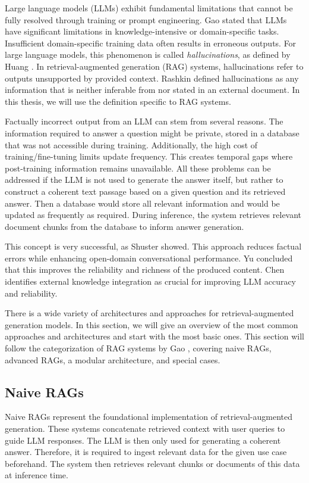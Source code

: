 Large language models (LLMs) exhibit fundamental limitations that cannot be fully resolved through training or prompt engineering. Gao \cite{Gao.18.12.2023} stated that LLMs have significant limitations in knowledge-intensive or domain-specific tasks. Insufficient domain-specific training data often results in erroneous outputs. For large language models, this phenomenon is called \textit{hallucinations}, as defined by Huang \cite{Huang_2023}. In retrieval-augmented generation (RAG) systems, hallucinations refer to outputs unsupported by provided context. Rashkin \cite{Rashkin.} defined hallucinations as any information that is neither inferable from nor stated in an external document. In this thesis, we will use the definition specific to RAG systems.

Factually incorrect output from an LLM can stem from several reasons. The information required to answer a question might be private, stored in a database that was not accessible during training. Additionally, the high cost of training/fine-tuning limits update frequency. This creates temporal gaps where post-training information remains unavailable. All these problems can be addressed if the LLM is not used to generate the answer itself, but rather to construct a coherent text passage based on a given question and its retrieved answer. Then a database would store all relevant information and would be updated as frequently as required. During inference, the system retrieves relevant document chunks from the database to inform answer generation.

This concept is very successful, as Shuster \cite{Shuster.} showed. This approach reduces factual errors while enhancing open-domain conversational performance. Yu \cite{Yu.2024} concluded that this improves the reliability and richness of the produced content. Chen \cite{Chen.2024} identifies external knowledge integration as crucial for improving LLM accuracy and reliability.

There is a wide variety of architectures and approaches for re\-triev\-al-aug\-ment\-ed generation models. In this section, we will give an overview of the most common approaches and architectures and start with the most basic ones. This section will follow the categorization of RAG systems by Gao \cite{Gao.18.12.2023}, covering naive RAGs, advanced RAGs, a modular architecture, and special cases.

\subsection{Naive RAGs}
\label{sec:naive_rags}
Naive RAGs represent the foundational implementation of retrieval-augmented generation. These systems concatenate retrieved context with user queries to guide LLM responses. The LLM is then only used for generating a coherent answer. Therefore, it is required to ingest relevant data for the given use case beforehand. The system then retrieves relevant chunks or documents of this data at inference time.


